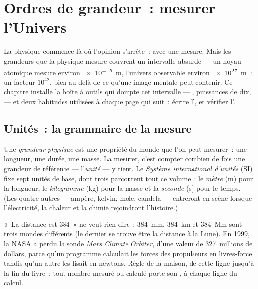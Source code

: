 \chapter{Ordres de grandeur~: mesurer l'Univers}\label{ch:g10:orders-of-magnitude}

La physique commence là où l'opinion s'arrête~: avec une mesure. Mais
les grandeurs que la physique mesure couvrent un intervalle absurde
--- un noyau atomique mesure environ \qty{e-15}{m}, l'univers
observable environ \qty{e27}{m}~: un facteur $10^{42}$, bien au-delà
de ce qu'une image mentale peut contenir. Ce chapitre installe la
boîte à outils qui dompte cet intervalle --- , puissances de
dix,  --- et deux habitudes utilisées à
chaque page qui suit~: écrire l', et vérifier l'.

\section{Unités~: la grammaire de la mesure}

\begin{definition}\label{def:g10:orders-of-magnitude:unit}
Une \emph{grandeur physique} est une
propriété du monde que l'on peut mesurer~: une longueur, une durée,
une masse. La mesurer, c'est compter combien de fois une grandeur de
référence --- l'\emph{unité} --- y tient. Le
\emph{Système international d'unités} (SI) fixe sept unités de base, dont trois parcourent
tout ce volume~: le \emph{mètre} (\unit{m}) pour la
longueur, le \emph{kilogramme} (\unit{kg}) pour la
masse et la \emph{seconde} (\unit{s}) pour le temps.
(Les quatre autres --- ampère, kelvin, mole, candela --- entreront en
scène lorsque l'électricité, la chaleur et la chimie rejoindront
l'histoire.)
\end{definition}

\begin{remark}\label{rem:g10:orders-of-magnitude:units}
«~La distance est $384$~» ne veut rien dire~: \qty{384}{mm},
\qty{384}{km} et \qty{384}{Mm} sont trois mondes différents (le dernier
se trouve être la distance à la Lune). En 1999, la NASA a perdu la
sonde \emph{Mars Climate Orbiter}, d'une valeur de 327~millions de
dollars, parce qu'un programme calculait les forces des propulseurs en
livres-force tandis qu'un autre les lisait en newtons. Règle de la
maison, de cette ligne jusqu'à la fin du livre~: tout nombre mesuré ou
calculé porte son , à chaque ligne du calcul.
\end{remark}

